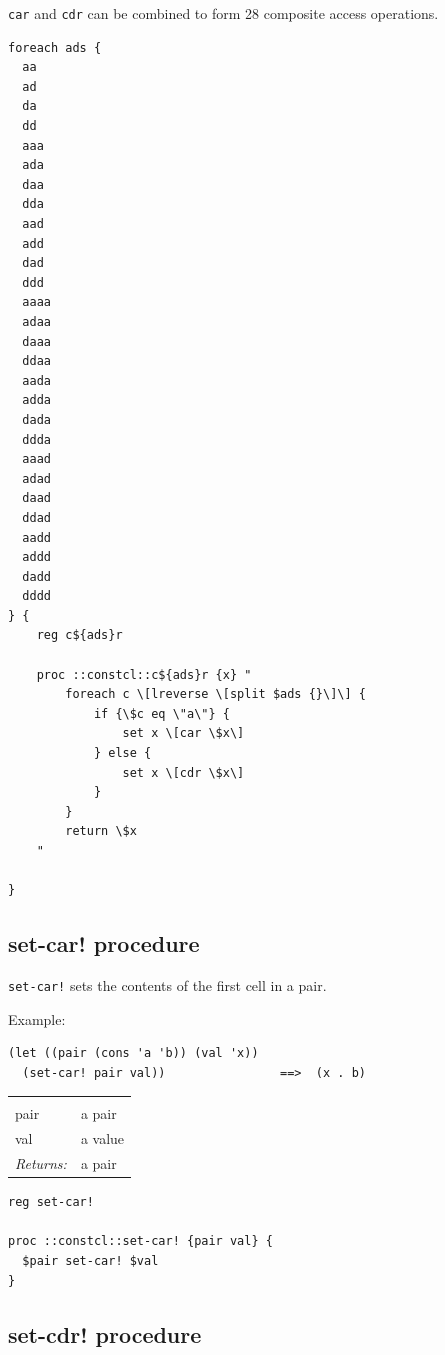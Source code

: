 \documentclass[a5paper,draft]{memoir}
\begin{document}
\texttt{car} and \texttt{cdr} can be combined to form 28 composite access operations.

\begin{lstlisting}
foreach ads {
  aa
  ad
  da
  dd
  aaa
  ada
  daa
  dda
  aad
  add
  dad
  ddd
  aaaa
  adaa
  daaa
  ddaa
  aada
  adda
  dada
  ddda
  aaad
  adad
  daad
  ddad
  aadd
  addd
  dadd
  dddd
} {
    reg c${ads}r

    proc ::constcl::c${ads}r {x} "
        foreach c \[lreverse \[split $ads {}\]\] {
            if {\$c eq \"a\"} {
                set x \[car \$x\]
            } else {
                set x \[cdr \$x\]
            }
        }
        return \$x
    "

}
\end{lstlisting}

\subsection{set-car! procedure}
\label{setcar-procedure}

\texttt{set-car!} sets the contents of the first cell in a pair.

Example:

\begin{verbatim}
(let ((pair (cons 'a 'b)) (val 'x))
  (set-car! pair val))                ==>  (x . b)
\end{verbatim}

\noindent\begin{tabular}{ |p{1.9cm} p{6.5cm}| }
\hline
\rowcolor[HTML]{CCCCCC} \multicolumn{2}{|l|}{\textbf{set-car! (public)}} \\
pair & a pair \\
val & a value \\
\textit{Returns:} & a pair \\
\hline
\end{tabular}

\begin{lstlisting}
reg set-car!

proc ::constcl::set-car! {pair val} {
  $pair set-car! $val
}
\end{lstlisting}

\subsection{set-cdr! procedure}
\label{setcdr-procedure}
\end{document}
